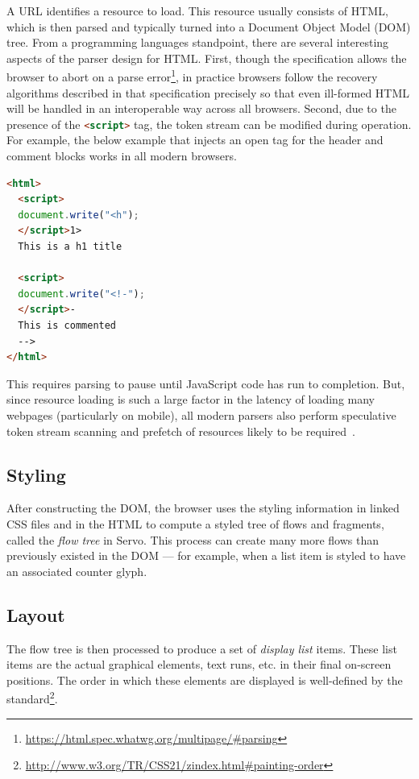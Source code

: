 A URL identifies a resource to load.
This resource usually consists of HTML, which is then parsed and typically turned into a Document Object
Model (DOM) tree.
From a programming languages standpoint, there are several interesting aspects of the parser design
for HTML.
First, though the specification allows the browser to abort on a parse error\footnote{\url{https://html.spec.whatwg.org/multipage/#parsing}},
in practice browsers follow the recovery algorithms described in that specification precisely so that
even ill-formed HTML will be handled in an interoperable way across all browsers.
Second, due to the presence of the \lstinline[language=HTML]{<script>} tag, the token stream can be modified
during operation.
For example, the below example that injects an open tag for the header and comment blocks works in all modern browsers.
\begin{lstlisting}[language=HTML]
<html>
  <script>
  document.write("<h");
  </script>1>
  This is a h1 title

  <script>
  document.write("<!-");
  </script>-
  This is commented
  -->
</html>
\end{lstlisting}
This requires parsing to pause until JavaScript code has run to completion.
But, since resource loading is such a large factor in the latency of loading many webpages (particularly on mobile),
all modern parsers also perform speculative token stream scanning and prefetch of resources likely to be required~\cite{browsers-slow-smartphones}.

\subsection{Styling}

After constructing the DOM, the browser uses the styling information in linked
CSS files and in the HTML to compute a styled tree of flows and fragments,
called the \emph{flow tree} in Servo.
This process can create many more flows than previously existed in the DOM ---
for example, when a list item is styled to have an associated counter glyph.

\subsection{Layout}

The flow tree is then processed to produce a set of \emph{display list} items.
These list items are the actual graphical elements, text runs, etc. in their
final on-screen positions.
The order in which these elements are displayed is well-defined by the
standard\footnote{\url{http://www.w3.org/TR/CSS21/zindex.html#painting-order}}.

